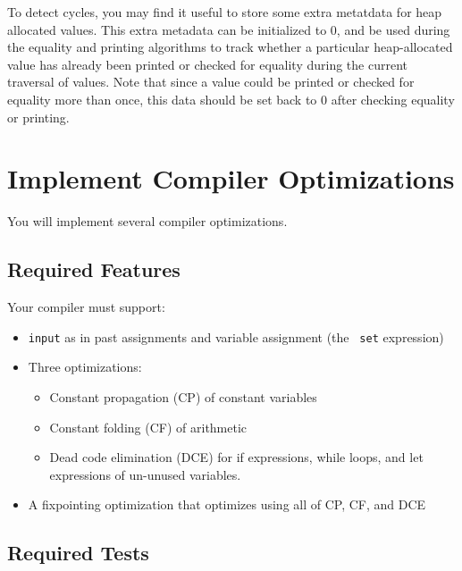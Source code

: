 \documentclass[10pt, oneside]{article}
\begin{document}
To detect cycles, you may find it useful to store some extra metatdata for
heap allocated values. This extra metadata can be initialized to 0, and be
used during the equality and printing algorithms to track whether a
particular heap-allocated value has already been printed or checked for
equality during the current traversal of values. Note that since a value
could be printed or checked for equality more than once, this data should be
set back to 0 after checking equality or printing.


\section*{Implement Compiler Optimizations}

You will implement several compiler optimizations.

\subsection*{Required Features}

Your compiler must support:

\begin{itemize}

\item {\tt input} as in past assignments and variable assignment (the {\tt
set} expression)

\item Three optimizations:

\begin{itemize}
  \item Constant propagation (CP) of constant variables

  \item Constant folding (CF) of arithmetic

  \item Dead code elimination (DCE) for if expressions, while loops, and let
  expressions of un-unused variables.

\end{itemize}

\item A fixpointing optimization that optimizes using all of CP, CF, and DCE

\end{itemize}

\subsection*{Required Tests}
\end{document}
